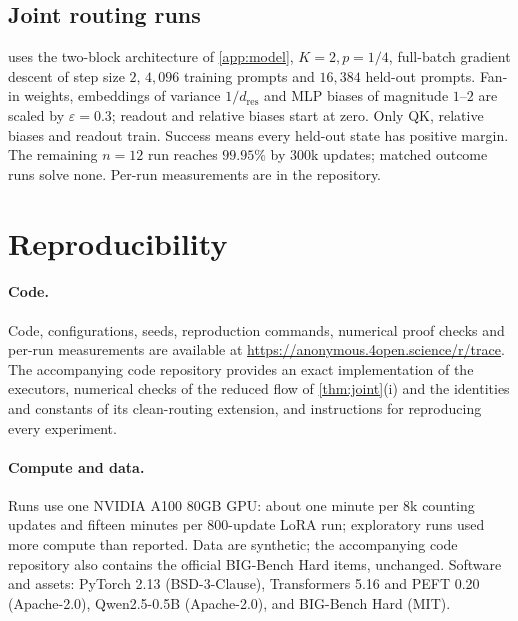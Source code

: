 \subsection{Joint routing runs}
\label{app:reach}

 uses the two-block architecture of \cref{app:model}, $K=2,p=1/4$,
full-batch gradient descent of step size $2$, $4{,}096$ training prompts and $16{,}384$
held-out prompts. Fan-in weights, embeddings of variance $1/d_{\mathrm{res}}$ and
MLP biases of magnitude $1$--$2$ are scaled by $\varepsilon=0.3$; readout and relative
biases start at zero. Only QK, relative biases and readout train. Success means every
held-out state has positive margin. The remaining $n=12$ run reaches $99.95\%$ by
$300$k updates; matched outcome runs solve none. Per-run measurements are in the repository.

\section{Reproducibility}
\label{app:reproducibility}

\paragraph{Code.} Code, configurations, seeds, reproduction commands, numerical proof checks and per-run measurements are available at
\url{https://anonymous.4open.science/r/trace}. The accompanying code repository provides an exact implementation of the executors,
numerical checks of the reduced flow of \cref{thm:joint}(i) and the identities and constants of its clean-routing extension, and instructions for reproducing every experiment.

\paragraph{Compute and data.} Runs use one NVIDIA A100 80GB GPU: about one minute per $8$k counting updates and fifteen minutes per
$800$-update LoRA run; exploratory runs used more compute than reported. Data are synthetic; the accompanying code repository also
contains the official BIG-Bench Hard items, unchanged. Software and assets: PyTorch 2.13 (BSD-3-Clause), Transformers 5.16 and PEFT 0.20 (Apache-2.0), Qwen2.5-0.5B \citep{qwen2025qwen25} (Apache-2.0), and BIG-Bench Hard \citep{suzgun2022challenging} (MIT).

